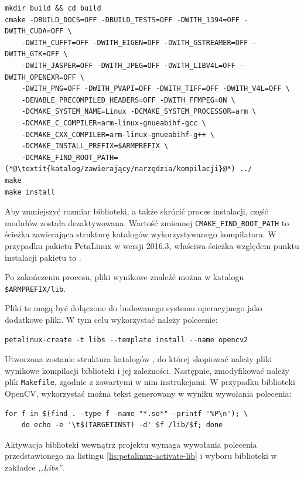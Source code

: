 {\begin{lstlisting}[breaklines=true, caption=Kompilacja biblioteki \textit{OpenCV}.]
mkdir build && cd build
cmake -DBUILD_DOCS=OFF -DBUILD_TESTS=OFF -DWITH_1394=OFF -DWITH_CUDA=OFF \
	-DWITH_CUFFT=OFF -DWITH_EIGEN=OFF -DWITH_GSTREAMER=OFF -DWITH_GTK=OFF \
	-DWITH_JASPER=OFF -DWITH_JPEG=OFF -DWITH_LIBV4L=OFF -DWITH_OPENEXR=OFF \
	-DWITH_PNG=OFF -DWITH_PVAPI=OFF -DWITH_TIFF=OFF -DWITH_V4L=OFF \
	-DENABLE_PRECOMPILED_HEADERS=OFF -DWITH_FFMPEG=ON \
	-DCMAKE_SYSTEM_NAME=Linux -DCMAKE_SYSTEM_PROCESSOR=arm \
	-DCMAKE_C_COMPILER=arm-linux-gnueabihf-gcc \
	-DCMAKE_CXX_COMPILER=arm-linux-gnueabihf-g++ \
	-DCMAKE_INSTALL_PREFIX=$ARMPREFIX \
	-DCMAKE_FIND_ROOT_PATH=(*@\textit{katalog/zawierający/narzędzia/kompilacji}@*) ../
make
make install
\end{lstlisting}

Aby zmniejszyć rozmiar biblioteki, a także skrócić proces instalacji, część modułów została dezaktywowana. Wartość zmiennej \texttt{CMAKE\_FIND\_ROOT\_PATH} to ścieżka zawierająca strukturę katalogów wykorzystywanego kompilatora. W przypadku pakietu PetaLinux w wersji 2016.3, właściwa ścieżka względem punktu instalacji pakietu to .

Po zakończeniu procesu, pliki wynikowe znaleźć można w katalogu \texttt{\$ARMPREFIX/lib}.

Pliki te mogą być dołączone do budowanego systemu operacyjnego jako dodatkowe pliki. W tym celu wykorzystać należy polecenie:

\begin{lstlisting}[breaklines=true]
petalinux-create -t libs --template install --name opencv2
\end{lstlisting}

Utworzona zostanie struktura katalogów , do której skopiować należy pliki wynikowe kompilacji biblioteki i jej zależności. Następnie, zmodyfikować należy plik \texttt{Makefile}, zgodnie z zawartymi w nim instrukcjami. W przypadku biblioteki OpenCV, wykorzystać można tekst generowany w wyniku wywołania polecenia:

\begin{lstlisting}[breaklines=true]
for f in $(find . -type f -name "*.so*" -printf '%P\n'); \
	do echo -e '\t$(TARGETINST) -d' $f /lib/$f; done
\end{lstlisting}

Aktywacja biblioteki wewnątrz projektu wymaga wywołania polecenia przedstawionego na listingu \ref{lis:petalinux-activate-lib} i wyboru biblioteki w zakładce \textit{,,Libs''}. 

}
